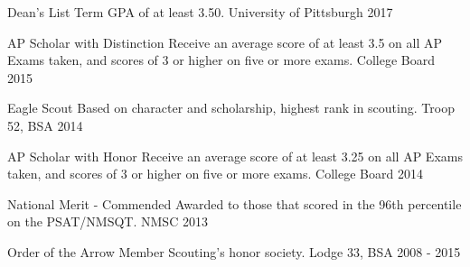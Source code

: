 
\vspace{-2mm}
\begin{cvhonors}

  \cvhonor
    {Dean's List} %
    {Term GPA of at least 3.50.} %
    {University of Pittsburgh} %
    {2017} %

  \cvhonor
    {AP Scholar with Distinction} %
    {Receive an average score of at least 3.5 on all AP Exams taken, and scores of 3 or higher on five or more exams.} %
    {College Board} %
    {2015} %

  \cvhonor
    {Eagle Scout} %
    {Based on character and scholarship, highest rank in scouting.} %
    {Troop 52, BSA} %
    {2014} %

  \cvhonor
    {AP Scholar with Honor} %
    {Receive an average score of at least 3.25 on all AP Exams taken, and scores of 3 or higher on five or more exams.} %
    {College Board} %
    {2014} %

  \cvhonor
    {National Merit - Commended} %
    {Awarded to those that scored in the 96th percentile on the PSAT/NMSQT.} %
    {NMSC} %
    {2013} %

  \cvhonor
    {Order of the Arrow Member} %
    {Scouting’s honor society.} %
    {Lodge 33, BSA} %
    {2008 - 2015} %

\end{cvhonors}

